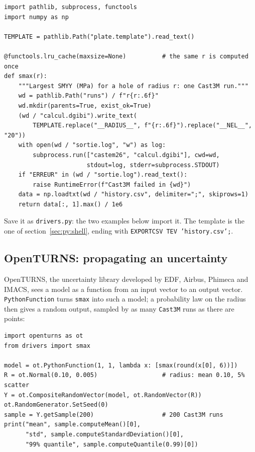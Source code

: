\begin{codebox}
\begin{verbatim}
import pathlib, subprocess, functools
import numpy as np

TEMPLATE = pathlib.Path("plate.template").read_text()

@functools.lru_cache(maxsize=None)          # the same r is computed once
def smax(r):
    """Largest SMYY (MPa) for a hole of radius r: one Cast3M run."""
    wd = pathlib.Path("runs") / f"r{r:.6f}"
    wd.mkdir(parents=True, exist_ok=True)
    (wd / "calcul.dgibi").write_text(
        TEMPLATE.replace("__RADIUS__", f"{r:.6f}").replace("__NEL__", "20"))
    with open(wd / "sortie.log", "w") as log:
        subprocess.run(["castem26", "calcul.dgibi"], cwd=wd,
                       stdout=log, stderr=subprocess.STDOUT)
    if "ERREUR" in (wd / "sortie.log").read_text():
        raise RuntimeError(f"Cast3M failed in {wd}")
    data = np.loadtxt(wd / "history.csv", delimiter=";", skiprows=1)
    return data[:, 1].max() / 1e6
\end{verbatim}
\end{codebox}

\noindent Save it as \texttt{drivers.py}: the two examples below import it.
The template is the one of section~\ref{sec:py:shell}, ending with
\texttt{EXPORTCSV TEV 'history.csv';}.

\subsection{OpenTURNS: propagating an uncertainty}
\label{sec:py:openturns}

%
OpenTURNS, the uncertainty library developed by EDF, Airbus, Phimeca and
IMACS, sees a model as a function from an input vector to an output vector.
\texttt{PythonFunction} turns \texttt{smax} into such a model; a probability
law on the radius then gives a random output, sampled by as many
\texttt{Cast3M} runs as there are points:

\begin{codebox}
\begin{verbatim}
import openturns as ot
from drivers import smax

model = ot.PythonFunction(1, 1, lambda x: [smax(round(x[0], 6))])
R = ot.Normal(0.10, 0.005)                  # radius: mean 0.10, 5% scatter
Y = ot.CompositeRandomVector(model, ot.RandomVector(R))
ot.RandomGenerator.SetSeed(0)
sample = Y.getSample(200)                   # 200 Cast3M runs
print("mean", sample.computeMean()[0],
      "std", sample.computeStandardDeviation()[0],
      "99% quantile", sample.computeQuantile(0.99)[0])
\end{verbatim}
\end{codebox}

